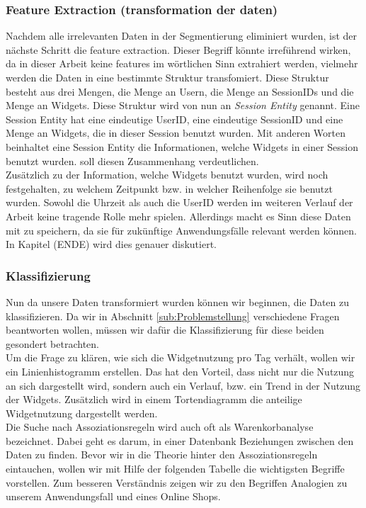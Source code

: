 \subsubsection{Feature Extraction (transformation der daten)}
	\label{ssub:Feature_extraction}
Nachdem alle irrelevanten Daten in der Segmentierung eliminiert wurden, ist der nächste Schritt die feature extraction. Dieser Begriff könnte irreführend wirken, da in dieser Arbeit keine features im wörtlichen Sinn extrahiert werden, vielmehr werden die Daten in eine bestimmte Struktur transfomiert. Diese Struktur besteht aus drei Mengen, die Menge an Usern, die Menge an SessionIDs und die Menge an Widgets. Diese Struktur wird von nun an \textit{Session Entity} genannt. Eine Session Entity hat eine eindeutige UserID, eine eindeutige SessionID und eine Menge an Widgets, die in dieser Session benutzt wurden. Mit anderen Worten beinhaltet eine Session Entity die Informationen, welche Widgets in einer Session benutzt wurden.  soll diesen Zusammenhang verdeutlichen.\\
Zusätzlich zu der Information, welche Widgets benutzt wurden, wird noch festgehalten, zu welchem Zeitpunkt bzw. in welcher Reihenfolge sie benutzt wurden. Sowohl die Uhrzeit als auch die UserID werden im weiteren Verlauf der Arbeit keine tragende Rolle mehr spielen. Allerdings macht es Sinn diese Daten mit zu speichern, da sie für zukünftige Anwendungsfälle relevant werden können. In Kapitel (ENDE) wird dies genauer diskutiert.

\subsubsection{Klassifizierung}
\label{ssub:Klassifizierung}
Nun da unsere Daten transformiert wurden können wir beginnen, die Daten zu klassifizieren. 
Da wir in Abschnitt \ref{sub:Problemstellung} verschiedene Fragen beantworten wollen, müssen wir dafür die Klassifizierung für diese beiden gesondert betrachten.
\\
Um die Frage zu klären, wie sich die Widgetnutzung pro Tag verhält, wollen wir ein Linienhistogramm erstellen. Das hat den Vorteil, dass nicht nur die Nutzung an sich dargestellt wird, sondern auch ein Verlauf, bzw. ein Trend in der Nutzung der Widgets. Zusätzlich wird in einem Tortendiagramm die anteilige Widgetnutzung dargestellt werden.
\\
Die Suche nach Assoziationsregeln wird auch oft als Warenkorbanalyse bezeichnet. Dabei geht es darum, in einer Datenbank Beziehungen zwischen den Daten zu finden. Bevor wir in die Theorie hinter den Assoziationsregeln eintauchen, wollen wir mit Hilfe der folgenden Tabelle die wichtigsten Begriffe vorstellen. Zum besseren Verständnis zeigen wir zu den Begriffen Analogien zu unserem Anwendungsfall und eines Online Shops.

